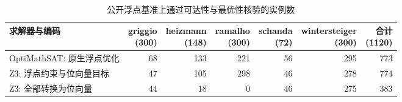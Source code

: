 \begin{table}[!htbp]
\centering
\caption{公开浮点基准上通过可达性与最优性核验的实例数}
\label{tab:exp-public-fp}
\small
\setlength{\tabcolsep}{3pt}
\begin{tabular*}{\textwidth}{@{\extracolsep{\fill}}lrrrrrr@{}}
\toprule
求解器与编码 & \shortstack{griggio\\(300)} & \shortstack{heizmann\\(148)} & \shortstack{ramalho\\(300)} & \shortstack{schanda\\(72)} & \shortstack{wintersteiger\\(300)} & \shortstack{合计\\(1120)} \\
\midrule
OptiMathSAT: 原生浮点优化 & 68 & 133 & 221 & 56 & 295 & 773 \\
Z3: 浮点约束与位向量目标 & 47 & 105 & 298 & 46 & 278 & 774 \\
Z3: 全部转换为位向量 & 44 & 18 & 0 & 46 & 275 & 383 \\
\bottomrule
\end{tabular*}
\end{table}
